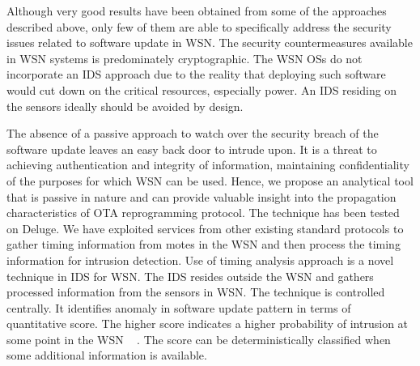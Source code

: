 \documentclass[conference]{IEEEtran}
\begin{document}
Although very good results have been obtained from some of the approaches described above, only few of them are able to specifically address the security issues related to software update in WSN.
The security countermeasures available in WSN systems is predominately cryptographic.
The WSN OSs do not incorporate an IDS approach due to the reality that deploying such software would cut down on the critical resources, especially power.
An IDS residing on the sensors ideally should be avoided by design.

The absence of a passive approach to watch over the security breach of the software update leaves an easy back door  to intrude upon.
It is a threat to achieving authentication and integrity of information, maintaining confidentiality of the purposes for which WSN can be used.
Hence, we propose an analytical tool that is passive in nature and can provide valuable insight into the propagation characteristics of OTA reprogramming protocol. 
The technique has been tested on Deluge.
We have exploited services from other existing standard protocols to gather timing information from motes in  the WSN and then process the timing information for intrusion detection.
Use of timing analysis approach is a novel technique in IDS for WSN.
The IDS  resides outside the WSN and gathers processed information from the sensors in WSN.
The technique is controlled  centrally.
It  identifies anomaly in software update pattern in terms of quantitative score. 
The higher score indicates a higher probability of intrusion at some point in the WSN ~\cite{aalam14, aalam15} . 
The score can be deterministically classified when some additional information is available.
\end{document}
